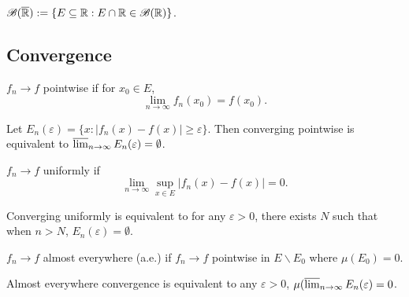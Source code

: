 \documentclass[class=book, crop=false]{standalone}
\begin{document}
        \begin{definition}
            $\mathscr{B}(\overline{\mathbb{R}}) := \{E \subseteq \mathbb{R} : E \cap \mathbb{R} \in \mathscr{B}(\mathbb{R})\}$.
        \end{definition}

        \subsection{Convergence}
        \begin{definition}
            $f_n \rightarrow f$ pointwise if for $x_0 \in E$,
            \begin{equation*}
                \lim_{n \rightarrow \infty} f_n(x_0) = f(x_0).
            \end{equation*}
        \end{definition}
        \begin{remark}
            Let $E_n(\varepsilon) = \{x : |f_n(x) - f(x)| \geq \varepsilon\}$. Then converging pointwise is equivalent to $\varlimsup_{n \rightarrow \infty} E_n(\varepsilon) = \emptyset$.
        \end{remark}

        \begin{definition}
            $f_n \rightarrow f$ uniformly if
            \begin{equation*}
                \lim_{n \rightarrow \infty} \sup_{x \in E} |f_n(x) - f(x)| = 0.
            \end{equation*}
        \end{definition}
        \begin{remark}
            Converging uniformly is equivalent to for any $\varepsilon > 0$, there exists $N$ such that when $n > N$, $E_n(\varepsilon) = \emptyset$.
        \end{remark}

        \begin{definition}
            $f_n \rightarrow f$ almost everywhere (a.e.) if $f_n \rightarrow f$ pointwise in $E \backslash E_0$ where $\mu(E_0) = 0$.
        \end{definition}
        \begin{remark}
            Almost everywhere convergence is equivalent to any $\varepsilon > 0$, $\mu(\varlimsup_{n \rightarrow \infty} E_n(\varepsilon) = 0$.
        \end{remark}
\end{document}
